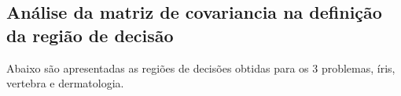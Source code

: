 \documentclass[ 
	article,			%
	11pt,				%
	oneside,			%
	a4paper,			%
	english,			%
	brazil,				%
	]{abntex2}
\begin{document}
% 
% 
% 
% 
% 
% 
% 
% 
% 
% 
% 
% 
% 


\subsection{Análise da matriz de covariancia na definição da região de decisão}
Abaixo são apresentadas as regiões de decisões obtidas para os 3 problemas,
íris, vertebra e dermatologia. 
\end{document}
